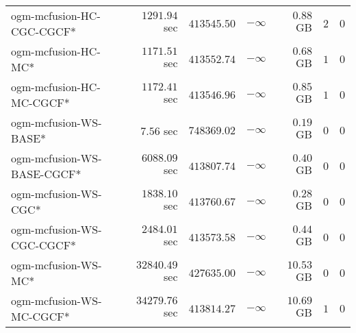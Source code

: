 \begin{table}[H]
\begin{tabular}{lrrrrrr}
ogm-mcfusion-HC-CGC-CGCF* & $      1291.94$ sec & $    413545.50$ & $-\infty$ & $         0.88$ GB & $       2$ & $       0$ \\ 
 ogm-mcfusion-HC-MC* & $      1171.51$ sec & $    413552.74$ & $-\infty$ & $         0.68$ GB & $       1$ & $       0$ \\ 
ogm-mcfusion-HC-MC-CGCF* & $      1172.41$ sec & $    413546.96$ & $-\infty$ & $         0.85$ GB & $       1$ & $       0$ \\ 
ogm-mcfusion-WS-BASE* & $         7.56$ sec & $    748369.02$ & $-\infty$ & $         0.19$ GB & $       0$ & $       0$ \\ 
ogm-mcfusion-WS-BASE-CGCF* & $      6088.09$ sec & $    413807.74$ & $-\infty$ & $         0.40$ GB & $       0$ & $       0$ \\ 
ogm-mcfusion-WS-CGC* & $      1838.10$ sec & $    413760.67$ & $-\infty$ & $         0.28$ GB & $       0$ & $       0$ \\ 
ogm-mcfusion-WS-CGC-CGCF* & $      2484.01$ sec & $    413573.58$ & $-\infty$ & $         0.44$ GB & $       0$ & $       0$ \\ 
 ogm-mcfusion-WS-MC* & $     32840.49$ sec & $    427635.00$ & $-\infty$ & $        10.53$ GB & $       0$ & $       0$ \\ 
ogm-mcfusion-WS-MC-CGCF* & $     34279.76$ sec & $    413814.27$ & $-\infty$ & $        10.69$ GB & $       1$ & $       0$ \\ 
\bottomrule
\end{tabular}
\end{table}